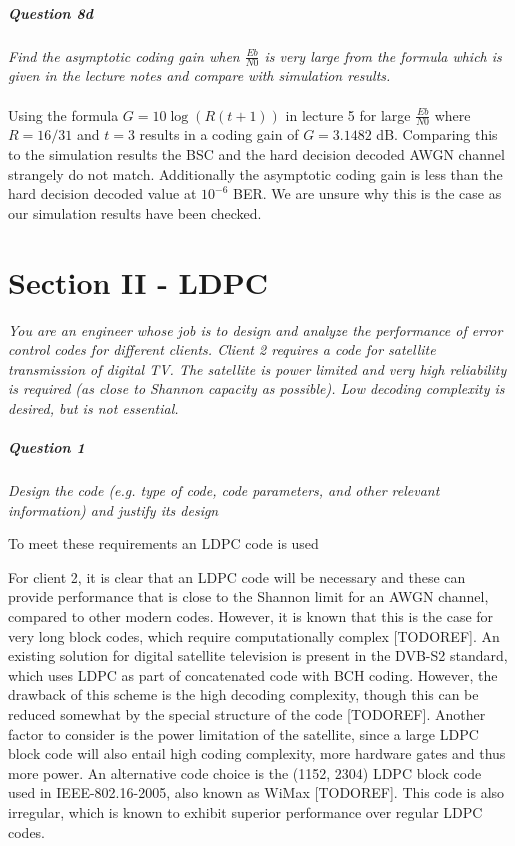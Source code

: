 \documentclass[a4paper]{article}
\begin{document}
\subsubsection{Question 8d} \textit{Find the asymptotic coding gain when $\frac{Eb}{N0}$ is very large from the formula which is given in the lecture notes and compare with simulation results.} \\
\\
Using the formula $G = 10\log(R(t+1))$ in lecture 5 for large $\frac{Eb}{N0}$ where $R = 16/31$ and $t = 3$ results in a coding gain of $G = 3.1482$ dB. Comparing this to the simulation results the BSC and the hard decision decoded AWGN channel strangely do not match. Additionally the asymptotic coding gain is less than the hard decision decoded value at $10^{-6}$ BER. We are unsure why this is the case as our simulation results have been checked.\\


\hrulefill
\newpage

\part*{Section II - LDPC}


\textit{You are an engineer whose job is to design and analyze the performance of error control codes for different clients. Client 2 requires a code for satellite transmission of digital TV. The satellite is power limited and very high reliability is required (as close to Shannon capacity as possible). Low decoding complexity is desired, but is not essential.} 

\subsubsection{Question 1} \textit{Design the code (e.g. type of code, code parameters, and other relevant information) and justify its design}

To meet these requirements an LDPC code is used

For client 2, it is clear that an LDPC code will be necessary and these can provide performance that is close to the Shannon limit for an AWGN channel, compared to other modern codes. However, it is known that this is the case for very long block codes, which require computationally complex [TODOREF].
An existing solution for digital satellite television is present in the DVB-S2
standard, which uses LDPC as part of concatenated code with BCH coding\cite{morello2006dvb}. However,
the drawback of this scheme is the high decoding complexity, though this can be 
reduced somewhat by the special structure of the code [TODOREF]. Another factor to consider is the power limitation of the satellite, since a large LDPC block code will also entail high coding complexity, more hardware gates and thus more power. An alternative code choice
is the (1152, 2304) LDPC block code used in IEEE-802.16-2005, also known as WiMax [TODOREF]. This code is also irregular, which is known to exhibit superior performance over regular LDPC codes.
\end{document}
